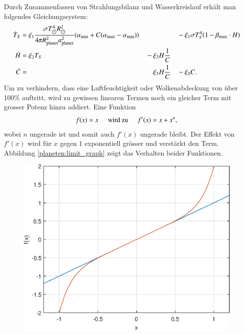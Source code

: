 \begin{refsection}
Durch Zusammenfassen von Strahlungsbilanz und Wasserkreislauf erhält man folgendes Gleichungssystem:
\begin{equation}
\begin{aligned}
\dot{T}_S
&=
\xi_1 \displaystyle\frac{\sigma T_{\astrosun}^4 R_{\astrosun}^2}{4 \pi R_{\text{planet}}^2 a_{\text{planet}}^2} (\alpha_{\text{min}} + C(\alpha_{\text{max}} - \alpha_{\text{min}}))&
	&&
		&-\xi_1 \sigma T_{S}^4  (1 - \beta_{\text{max}} \cdot H)\\
\dot{H}
&=
\xi_2 T_S&
	& -\xi_3 H \frac{1}{C}&
		&
\\
\dot{C}
&=&
	&\quad\hspace{0.27mm}
		\xi_3 H \frac{1}{C}&
		& - \xi_4 C
\text{.}
\end{aligned}
\end{equation}
Um zu verhindern, dass eine Luftfeuchtigkeit oder Wolkenabdeckung von über 100\% auftritt, wird zu gewissen linearen Termen noch ein gleicher Term mit grosser Potenz hinzu addiert. Eine Funktion
\begin{equation}
f(x) = x \hspace{0.5cm}\text{wird zu}\hspace{0.5cm} f'(x) = x + x^n \text{,}
\end{equation}
wobei $n$ ungerade ist und somit auch $f'(x)$ ungerade bleibt. Der Effekt von $f'(x)$ wird für $x$ gegen $1$ exponentiell grösser und verstärkt den Term. Abbildung \ref{planeten:limit_graph} zeigt das Verhalten beider Funktionen.
\begin{figure}%
	\center
	\includegraphics[height=0.45\textheight]{planeten/Matlab/figures/limiter.eps}

\end{figure}
\end{refsection}

